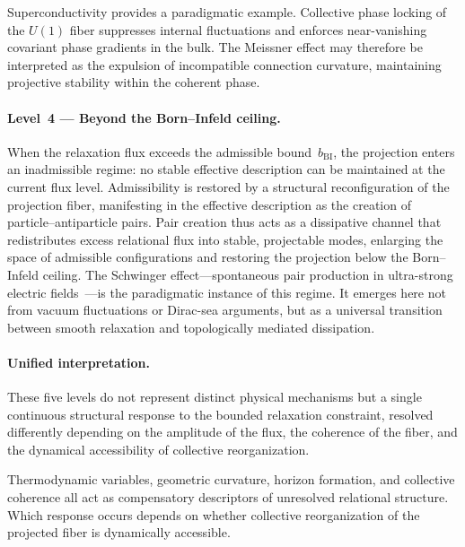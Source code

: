     Superconductivity provides a paradigmatic example.
    Collective phase locking of the $U(1)$ fiber
    suppresses internal fluctuations and enforces
    near-vanishing covariant phase gradients in the bulk.
    The Meissner effect may therefore be interpreted
    as the expulsion of incompatible connection curvature,
    maintaining projective stability within the coherent phase.

  \paragraph{Level~4 --- Beyond the Born--Infeld ceiling.}

    When the relaxation flux exceeds the admissible bound~$b_{\mathrm{BI}}$,
    the projection enters an inadmissible regime: no stable effective description can
    be maintained at the current flux level.
    Admissibility is restored by a structural reconfiguration of the projection fiber,
    manifesting in the effective description as the creation of particle--antiparticle pairs.
    Pair creation thus acts as a dissipative channel that redistributes excess relational
    flux into stable, projectable modes, enlarging the space of admissible configurations
    and restoring the projection below the Born--Infeld ceiling.
    The Schwinger effect---spontaneous pair production in ultra-strong electric
    fields~\cite{Beau2026f}---is the paradigmatic instance of this regime.
    It emerges here not from vacuum fluctuations or Dirac-sea arguments, but as a
    universal transition between smooth relaxation and topologically mediated dissipation.

  \paragraph{Unified interpretation.}

    These five levels do not represent distinct physical mechanisms but a single
    continuous structural response to the bounded relaxation constraint, resolved
    differently depending on the amplitude of the flux, the coherence of the fiber,
    and the dynamical accessibility of collective reorganization.

    Thermodynamic variables, geometric curvature, horizon formation, and collective
    coherence all act as compensatory descriptors of unresolved relational structure.
    Which response occurs depends on whether collective reorganization of the projected
    fiber is dynamically accessible.

